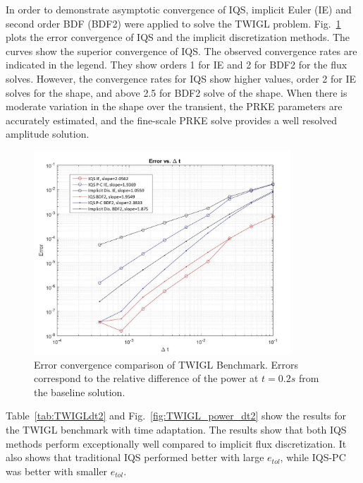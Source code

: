\documentclass{elsarticle}
\newcommand{\fig}[1]{Fig.~\ref{#1}}                      %
\newcommand{\tbl}[1]{Table~\ref{#1}}                     %
\newcommand{\iqspc}{IQS-PC\xspace}
\begin{document}

In order to demonstrate asymptotic convergence of IQS, implicit Euler (IE) and second order BDF (BDF2) were applied to solve the TWIGL problem. \fig{fig:TWIGL_conv} plots the error convergence of IQS and the implicit discretization methods.  The curves show the superior convergence of IQS. The observed convergence rates are indicated in the legend. They show orders 1 for IE and 2 for BDF2 for the flux solves. However, the convergence rates for IQS show higher values, order 2 for IE solves for the shape, and above 2.5 for BDF2 solve of the shape. When there is moderate variation in the shape over the transient, the PRKE parameters are accurately estimated, and the fine-scale PRKE solve provides a well resolved amplitude solution.

\begin{figure}[!htbp]
\centering
\includegraphics[height=3in]{figures/TWIGL_convergence.jpg}
\caption{Error convergence comparison of TWIGL Benchmark. Errors correspond to the relative difference of the power at $t=0.2 s$ from the baseline solution.}
\label{fig:TWIGL_conv}
\end{figure}


\tbl{tab:TWIGLdt2} and \fig{fig:TWIGL_power_dt2} show the results for the TWIGL benchmark with time adaptation.  The results show that both IQS methods perform exceptionally well compared to implicit flux discretization.  It also shows that traditional IQS performed better with large $e_{tol}$, while \iqspc was better with smaller $e_{tol}$.
\end{document}
